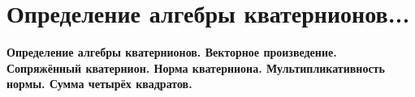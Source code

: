 \section{
	 Определение алгебры кватернионов... %
}

\textbf{ Определение алгебры кватернионов. Векторное произведение. Сопряжённый кватернион. Норма кватерниона. Мультипликативность нормы. Сумма четырёх квадратов.}